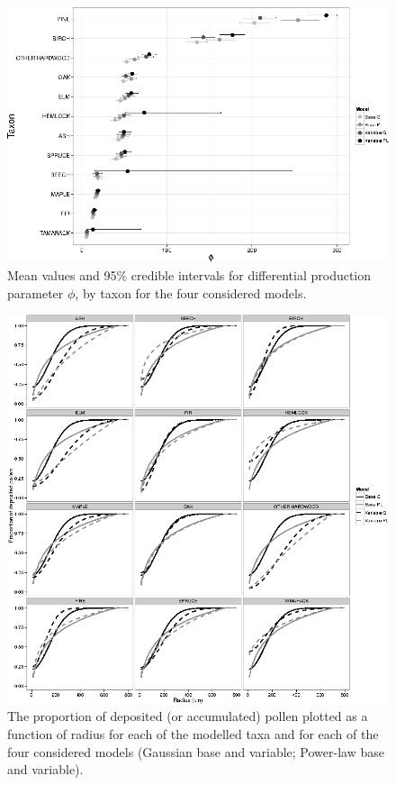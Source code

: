 \begin{figure}
\centering
\includegraphics[width=7in]{figures/phi.png}
\caption{Mean values and 95\% credible intervals for differential
  production parameter $\phi$, by taxon for the four considered
  models.}
\label{fig:phi}
\end{figure}

\begin{figure}
\centering
\includegraphics[width=7in]{figures/kernel_discrete_cdfs.png}
\caption{The proportion of deposited (or accumulated) pollen plotted
  as a function of radius for each of the modelled taxa and for each
  of the four considered models (Gaussian base and variable; Power-law
  base and variable).}
\label{fig:cdf}
\end{figure}


